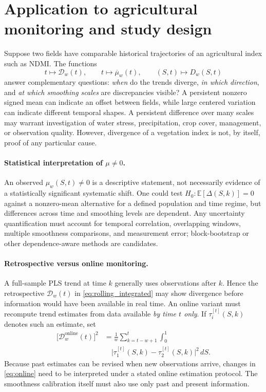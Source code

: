 \documentclass[10pt,letterpaper]{article}
\begin{document}
\section{Application to agricultural monitoring and study design}
\label{sec:application}
Suppose two fields have comparable historical trajectories of an
agricultural index such as NDMI. The functions
\begin{equation}
  t\longmapsto\mathcal D_w(t),\qquad
  t\longmapsto\overline\mu_w(t),\qquad
  (S,t)\longmapsto D_w(S,t)
\end{equation}
answer complementary questions: \emph{when} do the trends diverge,
\emph{in which direction}, and \emph{at which smoothing scales} are discrepancies visible?
A persistent nonzero signed mean can indicate an offset between fields,
while large centered variation can indicate different temporal shapes.
A persistent difference over many scales may warrant investigation of
water stress, precipitation, crop cover, management, or observation
quality. However, divergence of a vegetation index is not, by itself,
proof of any particular cause.

\paragraph{Statistical interpretation of $\mu\ne0$.}
An observed $\mu_w(S,t)\ne0$ is a descriptive statement, not
necessarily evidence of a statistically significant systematic shift.
One could test $H_0:\mathbb E[\Delta(S,k)]=0$ against a nonzero-mean
alternative for a defined population and time regime, but differences
across time and smoothing levels are dependent. Any uncertainty
quantification must account for temporal correlation, overlapping
windows, multiple smoothness comparisons, and measurement error;
block-bootstrap or other dependence-aware methods are candidates.

\paragraph{Retrospective versus online monitoring.}
A full-sample PLS trend at time $k$ generally uses observations after
$k$. Hence the retrospective $\mathcal D_w(t)$ in
\eqref{eq:rolling_integrated} may show divergence before information
would have been available in real time. An online variant must recompute
trend estimates from data available \emph{by time $t$ only}. If
$\tau_i^{[t]}(S,k)$ denotes such an estimate, set
\begin{equation}\label{eq:online}
\begin{aligned}
\bigl[\mathcal D_w^{\mathrm{online}}(t)\bigr]^2
 &=\frac1w\sum_{k=t-w+1}^{t}\int_0^1\\[-1pt]
 &\quad\bigl|\tau_1^{[t]}(S,k)-
 \tau_2^{[t]}(S,k)\bigr|^2\,dS.
\end{aligned}
\end{equation}
Because past estimates can be revised when new observations arrive,
changes in \eqref{eq:online} need to be interpreted under a stated
online estimation protocol. The smoothness calibration itself must
also use only past and present information.
\end{document}
